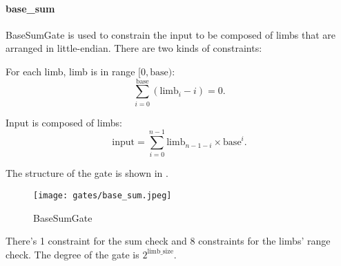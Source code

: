 \paragraph{base\_sum}

\hspace*{\fill}

\indent BaseSumGate is used to constrain the input to be composed of limbs that are arranged in little-endian. There are two kinds of constraints:

For each limb, limb is in range $[0, \text{base})$:
\[ \sum_{i=0}^{\text{base}}(\text{limb}_i - i) = 0. \]

Input is composed of limbs:
\[ \text{input} = \sum_{i=0}^{n-1} \text{limb}_{n-1-i} \times \text{base}^i. \]

The structure of the gate is shown in .
\begin{figure}[!ht]
    \centering
    \texttt{[image: gates/base\_sum.jpeg]}
    \caption{BaseSumGate}
    \label{fig:base-sum}
\end{figure}

There's 1 constraint for the sum check and 8 constraints for the limbs' range check. The degree of the gate is $2^{\text{limb\_size}}$.

